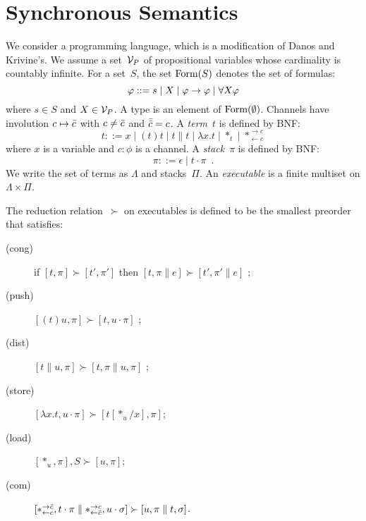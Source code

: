 \section{Synchronous Semantics}


\newcommand{\conc}{\parallel}
\newcommand{\comod}[2]{\ast^{\rightarrow {#2}}_{\leftarrow{#1}}}
\newcommand{\reader}[1]{\ast_{\leftarrow{#1}}}

We consider a programming language, which is a modification of
Danos and Krivine's.
We assume a set~$\mathcal V_P$ of propositional variables whose cardinality is
countably infinite.
For a set~$S$,
the set $\mathop{\text{Form}}(S)$ denotes the set of formulas:
\[
\varphi::= s \mid X \mid \varphi\rightarrow\varphi\mid \forall X \varphi
\]
where $s\in S$ and $X\in \mathcal V_P$.
A type is an element of $\mathop{\text{Form}}(\emptyset)$.
Channels have involution $c\mapsto\bar{c}$ with
$c\neq \bar{c}$ and
$\bar{\bar{c}} = c$.
A \textit{term}~$t$ is defined by BNF:
\[
 t::= x
 \mid (t)t
 \mid t\conc t
 \mid \lambda x.t
 \mid \ast_t
 \mid \comod c c
\]
where $x$ is a variable and $c\colon\phi$ is a channel.
A \textit{stack}~$\pi$ is defined by BNF:
\[
 \pi ::= \epsilon
 \mid t\cdot \pi
 \enspace.
\]
We write the set of terms as $\Lambda$ and stacks~$\Pi$.
An \textit{executable} is a finite multiset on $\Lambda \times \Pi$.

\newcommand{\red}{\succ}
The reduction relation~$\red$ on executables
is defined to be the smallest preorder
that satisfies:
\begin{description}
 \item[(cong)] if
	    $[t,\pi]         \red [ t',\pi']$
	    then
	    $[t,\pi \conc e] \red [ t',\pi'\conc e]$  \enspace;
 \item[(push)]
	    $[(t)u,\pi]      \red [t,u\cdot\pi]$      \enspace;
 \item[(dist)]
	    $[t\conc u,\pi]  \red [t,\pi\conc u,\pi]$ \enspace;
 \item[(store)]
	    $[\lambda x.t,u\cdot\pi]
	     \red
	     [t[\ast_u/x],      \pi]$\enspace;
 \item[(load)]
	    $[\ast_u,\pi],S\red[u,\pi]$\enspace;
 \item[(com)]
	    $[\comod c{\co c}, t\cdot\pi\conc \comod{\co c}c,
	    u\cdot\sigma] \red
	    [u,\pi\conc t,\sigma]$\enspace.
\end{description}

